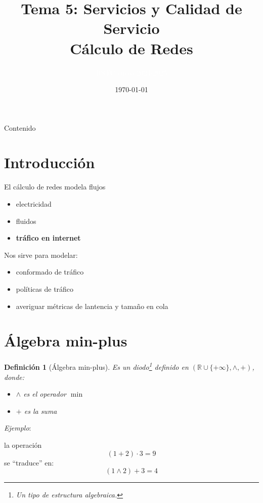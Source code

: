 \documentclass[xcolor={x11names}]{beamer}
\title[Tema 5]{Tema 5: Servicios y
Calidad de Servicio\\Cálculo de Redes}
\author{\textcolor{white}{RSTC curso 2024-2025}}
\date{\today}
\newtheorem{definicion}{Definición}[section]
\begin{document}
\frame{\titlepage }


\begin{frame}[allowframebreaks]{Contenido}
    \tableofcontents
\end{frame}




\section{Introducción}
\begin{frame}{\secname}
    El cálculo de redes modela flujos
    \begin{itemize}
        \item electricidad
        \item fluidos
        \item \textbf{tráfico en internet}
    \end{itemize}

    \vfill
    Nos sirve para modelar:
    \begin{itemize}
        \item conformado de tráfico
        \item políticas de tráfico
        \item averiguar métricas de
            lantencia y tamaño en cola
    \end{itemize}
\end{frame}



\section{Álgebra min-plus}
\begin{frame}{\secname}
    \begin{definicion}[Álgebra min-plus]
        Es un diodo\footnote{Un tipo de
        estructura algebraica.}
        definido en
        $(\mathbb{R}\cup \{+\infty\},
        \land, +)$, donde:
        \begin{itemize}
            \item $\land$ es el operador
                $\min$
            \item $+$ es la suma
        \end{itemize}
    \end{definicion}

    \vfill

    \emph{Ejemplo}:

    la operación
    \begin{equation*}
        (1+2)\cdot 3 = 9
    \end{equation*}
    se ``traduce'' en:
    \begin{equation*}
        (1\land2)+ 3 = 4
    \end{equation*}
\end{frame}
\end{document}
